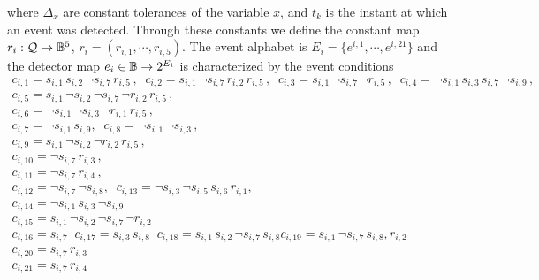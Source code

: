 {\color{red}where $\Delta_x$ are constant tolerances of the variable $x$, and $t_k$ is the instant at which an event was detected. Through these constants we
define the constant map $r_i :  \mathcal{Q} \rightarrow \Bbb{B}^5$, $r_i = (r_{i,1}, \cdots, r_{i,5})$.}
The event alphabet is $E_i = \{e^{i,1}, \cdots, e^{i,21}\}$ and the detector map $e_i \in \Bbb{B} \rightarrow 2^{E_i}$ is characterized by the event conditions 
\begin{equation*}
\begin{array}{l}
c_{i,1} = s_{i,1} \, s_{i,2} \, \neg s_{i, 7} \, r_{i, 5}\, , \;\;
c_{i,2} = s_{i, 1} \, \neg s_{i, 7} \, r_{i, 2} \, r_{i, 5} \, , \;\;
c_{i,3} = s_{i,1} \, \neg s_{i,7} \, \neg r_{i, 5} \, , \;\; 
c_{i,4} = \neg s_{i,1} \, s_{i,3} \, s_{i, 7} \, \neg s_{i, 9} \, , \;\;
\\
c_{i,5} = s_{i,1} \, \neg s_{i, 2} \, \neg s_{i, 7} \, \neg r_{i, 2} \, r_{i, 5}\, , \;\;
\\
c_{i,6} = \neg s_{i,1} \, \neg s_{i, 3} \, \neg r_{i, 1} \, r_{i, 5} \, , \;\;
\\
c_{i,7} = \neg s_{i,1} \, s_{i, 9}, \;\;
c_{i,8} = \neg s_{i, 1} \, \neg s_{i, 3} \, , \;\;
\\
c_{i,9} = s_{i, 1} \, \neg s_{i, 2} \, \neg r_{i, 2} \, r_{i,5} \, , \;\;
\\
c_{i,10} = \neg s_{i,7} \, r_{i,3} \, , \;\;
\\
c_{i,11} = \neg s_{i,7} \, r_{i,4} \, , \;\;
\\
c_{i,12} =  \neg s_{i, 7} \, \neg s_{i, 8} , \;\;
c_{i,13} =  \neg s_{i, 3} \, \neg s_{i, 5} \, s_{i, 6} \, r_{i, 1}, \;\;
\\
c_{i,14} =  \neg s_{i, 1} \,  s_{i, 3} \, \neg s_{i, 9}\;\;
\\
c_{i, 15} = s_{i, 1} \, \neg s_{i, 2} \, \neg s_{i, 7} \, \neg r_{i, 2} \;\;
\\
c_{i, 16} = s_{i, 7} \;\;
c_{i, 17} = s_{i, 3} \, s_{i, 8} \;\;
c_{i, 18} = s_{i, 1} \, s_{i, 2} \, \neg s_{i, 7} \, s_{i, 8}
c_{i, 19} = s_{i, 1} \, \neg s_{i, 7} \, s_{i, 8}, r_{i, 2} \;\;
\\
c_{i, 20} = s_{i, 7} \, r_{i, 3} \;\;
\\
c_{i, 21} = s_{i, 7} \, r_{i, 4}
\\
\end{array}
\end{equation*}
